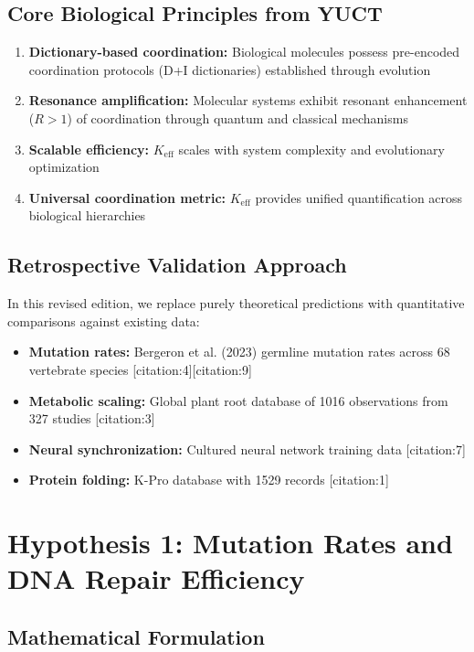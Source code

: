 \documentclass[11pt]{article}
\begin{document}
	\subsection{Core Biological Principles from YUCT}
	
	\begin{enumerate}
		\item \textbf{Dictionary-based coordination:} Biological molecules possess pre-encoded coordination protocols (D+I dictionaries) established through evolution
		\item \textbf{Resonance amplification:} Molecular systems exhibit resonant enhancement (\(R > 1\)) of coordination through quantum and classical mechanisms
		\item \textbf{Scalable efficiency:} \(K_{\text{eff}}\) scales with system complexity and evolutionary optimization
		\item \textbf{Universal coordination metric:} \(K_{\text{eff}}\) provides unified quantification across biological hierarchies
	\end{enumerate}
	
	\subsection{Retrospective Validation Approach}
	
	In this revised edition, we replace purely theoretical predictions with quantitative comparisons against existing data:
	
	\begin{itemize}
		\item \textbf{Mutation rates:} Bergeron et al. (2023) germline mutation rates across 68 vertebrate species [citation:4][citation:9]
		\item \textbf{Metabolic scaling:} Global plant root database of 1016 observations from 327 studies [citation:3]
		\item \textbf{Neural synchronization:} Cultured neural network training data [citation:7]
		\item \textbf{Protein folding:} K-Pro database with 1529 records [citation:1]
	\end{itemize}
	
	\section{Hypothesis 1: Mutation Rates and DNA Repair Efficiency}
	
	\subsection{Mathematical Formulation}
	
\end{document}
